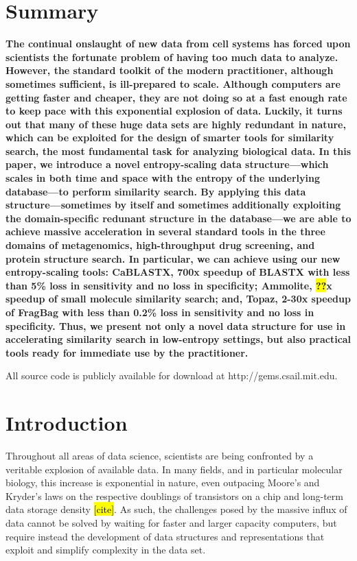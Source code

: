 \documentclass[review,preprint,12pt]{elsarticle}
\theoremstyle{definition}
\theoremstyle{remark}
\numberwithin{equation}{section}
\begin{document}
\section{Summary}
{ \bfseries
    The continual onslaught of new data from cell systems has forced upon scientists the fortunate problem of having too much data to analyze.
    However, the standard toolkit of the modern practitioner, although sometimes sufficient, is ill-prepared to scale.
    Although computers are getting faster and cheaper, they are not doing so at a fast enough rate to keep pace with this exponential explosion of data.
    Luckily, it turns out that many of these huge data sets are highly redundant in nature, which can be exploited for the design of smarter tools for similarity search, the most fundamental task for analyzing biological data.
    In this paper, we introduce a novel entropy-scaling data structure---which scales in both time and space with the entropy of the underlying database---to perform similarity search.
    By applying this data structure---sometimes by itself and sometimes additionally exploiting the domain-specific redunant structure in the database---we are able to achieve massive acceleration in several standard tools in the three domains of metagenomics, high-throughput drug screening, and protein structure search.
    In particular, we can achieve using our new entropy-scaling tools: CaBLASTX, 700x speedup of BLASTX with less than 5\% loss in sensitivity and no loss in specificity; Ammolite, \hl{??}x speedup of small molecule similarity search; and, Topaz, 2-30x speedup of FragBag with less than 0.2\% loss in sensitivity and no loss in specificity.
    Thus, we present not only a novel data structure for use in accelerating similarity search in low-entropy settings, but also practical tools ready for immediate use by the practitioner.

    All source code is publicly available for download at {http://gems.csail.mit.edu.}
}

\section{Introduction}
Throughout all areas of data science, scientists are being confronted by a veritable explosion of available data.
In many fields, and in particular molecular biology, this increase is exponential in nature, even outpacing Moore's and Kryder's laws on the respective doublings of transistors on a chip and long-term data storage density \hl{[cite]}.
As such, the challenges posed by the massive influx of data cannot be solved by waiting for faster and larger capacity computers, but require instead the development of data structures and representations that exploit and simplify complexity in the data set.
\end{document}
